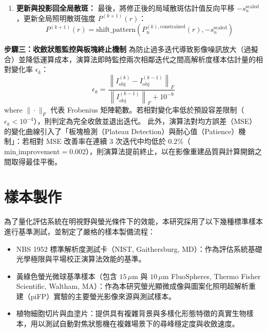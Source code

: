 \begin{enumerate}
    \begin{equation}
        \text{Mask}_{\text{OTF}}(u, v) = 
        \begin{cases}
            1.0, & \text{if } \text{OTF}(u, v) > 10^{-6} \\
            0.0, & \text{if } \text{OTF}(u, v) \leq 10^{-6}
        \end{cases}
    \end{equation}
    我們將受約束的頻域散斑反投影回空間物域，提取其實部並再次施加非負限制，得到物理一致的局域散斑強度 $P_n^{(k), \text{constrained}}(r)$：
    \begin{equation}
        P_n^{(k), \text{constrained}}(r) = \max\left( \text{Re}\left\{ \mathcal{F}^{-1}\left\{ \mathcal{F}\left\{ P_n^{(k), \text{filtered}} \right\}(u, v) \right\} \right\}, 0 \right)
    \end{equation}
    \item \textbf{更新與投影回全局散斑：}
    最後，將修正後的局域散斑估計值反向平移 $-s_n^{\text{scaled}}$，更新全局照明散斑強度 $P^{(k+1)}(r)$：
    \begin{equation}
        P^{(k+1)}(r) = \text{shift\_pattern}\left( P_n^{(k), \text{constrained}}(r), -s_n^{\text{scaled}} \right)
    \end{equation}
\end{enumerate}

\textbf{步驟三：收斂狀態監控與板塊終止機制}
為防止過多迭代導致影像噪訊放大（過擬合）並降低運算成本，演算法即時監控兩次相鄰迭代之間高解析度樣本估計量的相對變化率 $\epsilon_k$：
\begin{equation}
    \epsilon_k = \frac{\left\| I_{\text{obj}}^{(k)} - I_{\text{obj}}^{(k-1)} \right\|_F}{\left\| I_{\text{obj}}^{(k-1)} \right\|_F + 10^{-9}}
\end{equation}
where $\|\cdot\|_F$ 代表 Frobenius 矩陣範數。若相對變化率低於預設容差限制（$\epsilon_k < 10^{-4}$），則判定為完全收斂並退出迭代。
此外，演算法對均方誤差（MSE）的變化曲線引入了「板塊檢測（Plateau Detection）與耐心值（Patience）機制」：若相對 MSE 改善率在連續 3 次迭代中均低於 $0.2\%$（$\text{min\_improvement} = 0.002$），則演算法提前終止，以在影像重建品質與計算開銷之間取得最佳平衡。

\section{樣本製作}

為了量化評估系統在明視野與螢光條件下的效能，本研究採用了以下幾種標準樣本進行基準測試，並制定了嚴格的樣本製備流程：
\begin{itemize}
    \item NBS 1952 標準解析度測試卡（NIST, Gaithersburg, MD）：作為評估系統基礎光學極限與平場校正演算法效能的基準。
    \item 黃綠色螢光微球基準樣本（包含 $15\,\mu\text{m}$ 與 $10\,\mu\text{m}$ FluoSpheres, Thermo Fisher Scientific, Waltham, MA）：作為本研究螢光顯微成像與圖案化照明超解析重建（piFP）實驗的主要螢光影像來源與測試樣本。
    \item 植物細胞切片與血塗片：提供具有複雜背景與多樣化形態特徵的真實生物樣本，用以測試自動對焦狀態機在複雜場景下的尋峰穩定度與收斂速度。
\end{itemize}

